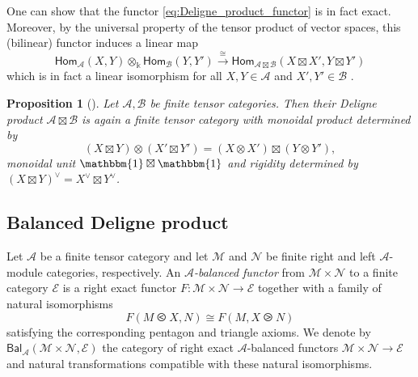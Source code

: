 \documentclass[11pt]{article}
\newtheorem{proposition}[theorem]{Proposition}
\theoremstyle{definition}
\begin{document}
One can  show that the functor \eqref{eq:Deligne_product_functor} is  in fact exact. Moreover, by the universal property of the tensor product of vector spaces, this (bilinear) functor induces a linear map
\begin{equation}
\mathsf{Hom}_{\mathcal{A}}(X,Y)\otimes_\Bbbk\mathsf{Hom}_{\mathcal{B}}(Y,Y') \overset{\cong}{\longrightarrow}\mathsf{Hom}_{\mathcal{A}\boxtimes\mathcal{B}}(X\boxtimes X',Y\boxtimes Y')
\end{equation}
which is in fact a linear isomorphism 
for all $X,Y \in \mathcal{A}$ and $X',Y' \in \mathcal{B}$ \cite[\S 1.11]{egno}.




\begin{proposition}[{\cite[Proposition 5.17]{deligne}}]\label{prop:Deligne_product_of_ftc}
Let $\mathcal{A}, \mathcal{B}$ be finite tensor categories. Then their Deligne product $\mathcal{A} \boxtimes \mathcal{B}$ is again a finite tensor category with monoidal product determined by $$ (X \boxtimes Y) \otimes (X' \boxtimes Y') = (X \otimes X') \boxtimes (Y \otimes Y'),  $$  monoidal unit $\mathbbm{1} \boxtimes \mathbbm{1}$ and rigidity determined by $(X \boxtimes Y)^\vee = X^\vee \boxtimes Y^\vee$.
\end{proposition}



\subsection{Balanced Deligne product}

Let $\mathcal{A}$ be a finite tensor category and let $\mathcal{M}$ and $\mathcal{N}$ be finite right and left $\mathcal{A}$-module categories, respectively. An \emph{$\mathcal{A}$-balanced functor} from $\mathcal{M} \times \mathcal{N}$ to a finite category $\mathcal{E}$  is a right exact functor $F: \mathcal{M} \times \mathcal{N} \longrightarrow \mathcal{E}$ together with a family of natural isomorphisms $$ F(M \olessthan X, N) \cong F(M, X \ogreaterthan N)   $$ satisfying  the corresponding pentagon and triangle axioms. We denote by $\mathsf{Bal}_\mathcal{A} (\mathcal{M} \times \mathcal{N} , \mathcal{E})$ the category of right exact $\mathcal{A}$-balanced functors $\mathcal{M} \times \mathcal{N} \longrightarrow \mathcal{E}$ and natural transformations compatible with these natural isomorphisms.
\end{document}
